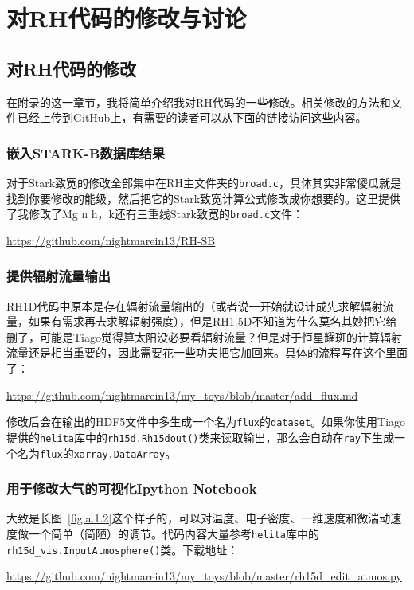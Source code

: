 
\chapter{对RH代码的修改与讨论}
\section{对RH代码的修改}
在附录的这一章节，我将简单介绍我对RH代码的一些修改。相关修改的方法和文件已经上传到GitHub上，有需要的读者可以从下面的链接访问这些内容。
\subsection{嵌入STARK-B数据库结果}
对于Stark致宽的修改全部集中在RH主文件夹的\texttt{broad.c}，具体其实非常傻瓜就是找到你要修改的能级，然后把它的Stark致宽计算公式修改成你想要的。这里提供了我修改了Mg \textsc{ii} h，k还有三重线Stark致宽的\texttt{broad.c}文件：

\url{https://github.com/nightmarein13/RH-SB}
\subsection{提供辐射流量输出}
RH1D代码中原本是存在辐射流量输出的（或者说一开始就设计成先求解辐射流量，如果有需求再去求解辐射强度），但是RH1.5D不知道为什么莫名其妙把它给删了，可能是Tiago觉得算太阳没必要看辐射流量？但是对于恒星耀斑的计算辐射流量还是相当重要的，因此需要花一些功夫把它加回来。具体的流程写在这个里面了：

\url{https://github.com/nightmarein13/my_toys/blob/master/add_flux.md}

修改后会在输出的HDF5文件中多生成一个名为\texttt{flux}的\texttt{dataset}。如果你使用Tiago提供的\texttt{helita}库中的\texttt{rh15d.Rh15dout()}类来读取输出，那么会自动在\texttt{ray}下生成一个名为\texttt{flux}的\texttt{xarray.DataArray}。
\subsection{用于修改大气的可视化Ipython Notebook}\label{sec:a.1.3}
大致是长图~\ref{fig:a.1.2}这个样子的，可以对温度、电子密度、一维速度和微湍动速度做一个简单（简陋）的调节。代码内容大量参考\texttt{helita}库中的\texttt{rh15d\_vis.InputAtmosphere()}类。下载地址：

\url{https://github.com/nightmarein13/my_toys/blob/master/rh15d_edit_atmos.py}

